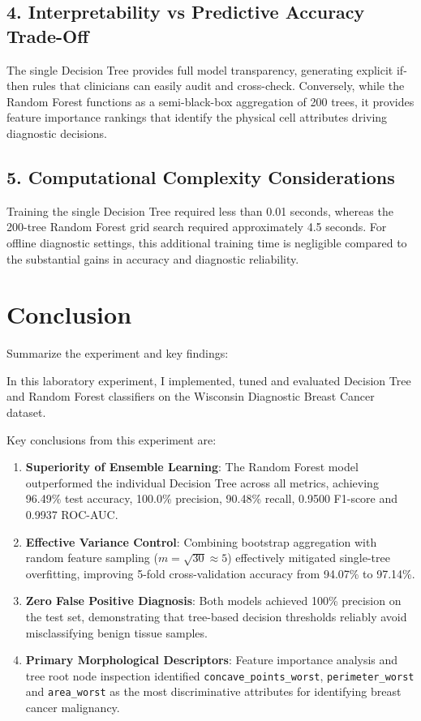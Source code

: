 \documentclass[12pt,a4paper]{article}
\begin{document}
\subsection*{4. Interpretability vs Predictive Accuracy Trade-Off}
The single Decision Tree provides full model transparency, generating explicit if-then rules that clinicians can easily audit and cross-check. Conversely, while the Random Forest functions as a semi-black-box aggregation of 200 trees, it provides feature importance rankings that identify the physical cell attributes driving diagnostic decisions.

\subsection*{5. Computational Complexity Considerations}
Training the single Decision Tree required less than 0.01 seconds, whereas the 200-tree Random Forest grid search required approximately 4.5 seconds. For offline diagnostic settings, this additional training time is negligible compared to the substantial gains in accuracy and diagnostic reliability.

\section{Conclusion}
Summarize the experiment and key findings:

In this laboratory experiment, I implemented, tuned and evaluated Decision Tree and Random Forest classifiers on the Wisconsin Diagnostic Breast Cancer dataset.

Key conclusions from this experiment are:
\begin{enumerate}
\item \textbf{Superiority of Ensemble Learning}: The Random Forest model outperformed the individual Decision Tree across all metrics, achieving 96.49\% test accuracy, 100.0\% precision, 90.48\% recall, 0.9500 F1-score and 0.9937 ROC-AUC.
\item \textbf{Effective Variance Control}: Combining bootstrap aggregation with random feature sampling ($m = \sqrt{30} \approx 5$) effectively mitigated single-tree overfitting, improving 5-fold cross-validation accuracy from 94.07\% to 97.14\%.
\item \textbf{Zero False Positive Diagnosis}: Both models achieved 100\% precision on the test set, demonstrating that tree-based decision thresholds reliably avoid misclassifying benign tissue samples.
\item \textbf{Primary Morphological Descriptors}: Feature importance analysis and tree root node inspection identified \texttt{concave\_points\_worst}, \texttt{perimeter\_worst} and \texttt{area\_worst} as the most discriminative attributes for identifying breast cancer malignancy.
\end{enumerate}
\end{document}
